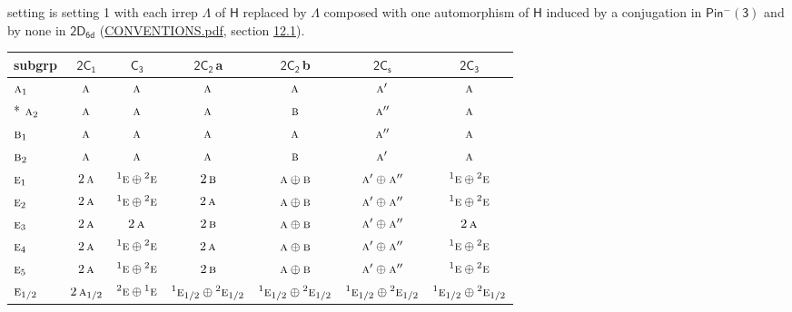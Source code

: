 \documentclass[10pt,a4paper]{article}
\numberwithin{equation}{section}
\newcommand{\grp}[1]{\mathsf{#1}}
\newcommand{\irr}[1]{\text{\normalfont\scshape #1}}
\newcommand{\conjpair}[1]{{}^{#1}}
\newcommand{\clsletter}[1]{\,{\scriptsize\color{black!55}#1}}
\begin{document}
setting is setting 1 with each irrep $\Lambda$ of $\grp{H}$ replaced by $\Lambda$ composed with one automorphism of $\grp{H}$ induced by a conjugation in \href{Pinminus3.pdf}{$\grp{Pin^{-}(3)}$} and by none in $\grp{2D_{6d}}$ (\href{../../CONVENTIONS.pdf}{CONVENTIONS.pdf}, section \href{../../../rotation/CONVENTIONS.pdf\#conv.12.1}{12.1}).
{\small\begin{longtable}{@{}lcccccc@{}}\toprule
subgrp & \href{2C1.pdf}{$\grp{2C_{1}}$} & \href{C3.pdf}{$\grp{C_{3}}$} & \href{2C2.pdf}{$\grp{2C_{2}}$}\clsletter{a} & \href{2C2.pdf}{$\grp{2C_{2}}$}\clsletter{b} & \href{2C1v.pdf}{$\grp{2C_{s}}$} & \href{2C3.pdf}{$\grp{2C_{3}}$}\\\midrule\endhead
\bottomrule\endfoot\endlastfoot
$\irr{a}_{1}$ & $\irr{a}$ & $\irr{a}$ & $\irr{a}$ & $\irr{a}$ & $\irr{a}'$ & $\irr{a}$\\*
$\irr{a}_{2}$ & $\irr{a}$ & $\irr{a}$ & $\irr{a}$ & $\irr{b}$ & $\irr{a}''$ & $\irr{a}$\\
$\irr{b}_{1}$ & $\irr{a}$ & $\irr{a}$ & $\irr{a}$ & $\irr{a}$ & $\irr{a}''$ & $\irr{a}$\\
$\irr{b}_{2}$ & $\irr{a}$ & $\irr{a}$ & $\irr{a}$ & $\irr{b}$ & $\irr{a}'$ & $\irr{a}$\\
$\irr{e}_{1}$ & $2\,\irr{a}$ & $\conjpair{1}\irr{e}\oplus \conjpair{2}\irr{e}$ & $2\,\irr{b}$ & $\irr{a}\oplus \irr{b}$ & $\irr{a}'\oplus \irr{a}''$ & $\conjpair{1}\irr{e}\oplus \conjpair{2}\irr{e}$\\
$\irr{e}_{2}$ & $2\,\irr{a}$ & $\conjpair{1}\irr{e}\oplus \conjpair{2}\irr{e}$ & $2\,\irr{a}$ & $\irr{a}\oplus \irr{b}$ & $\irr{a}'\oplus \irr{a}''$ & $\conjpair{1}\irr{e}\oplus \conjpair{2}\irr{e}$\\
$\irr{e}_{3}$ & $2\,\irr{a}$ & $2\,\irr{a}$ & $2\,\irr{b}$ & $\irr{a}\oplus \irr{b}$ & $\irr{a}'\oplus \irr{a}''$ & $2\,\irr{a}$\\
$\irr{e}_{4}$ & $2\,\irr{a}$ & $\conjpair{1}\irr{e}\oplus \conjpair{2}\irr{e}$ & $2\,\irr{a}$ & $\irr{a}\oplus \irr{b}$ & $\irr{a}'\oplus \irr{a}''$ & $\conjpair{1}\irr{e}\oplus \conjpair{2}\irr{e}$\\
$\irr{e}_{5}$ & $2\,\irr{a}$ & $\conjpair{1}\irr{e}\oplus \conjpair{2}\irr{e}$ & $2\,\irr{b}$ & $\irr{a}\oplus \irr{b}$ & $\irr{a}'\oplus \irr{a}''$ & $\conjpair{1}\irr{e}\oplus \conjpair{2}\irr{e}$\\
$\irr{e}_{1/2}$ & $2\,\irr{a}_{1/2}$ & $\conjpair{2}\irr{e}\oplus \conjpair{1}\irr{e}$ & $\conjpair{1}\irr{e}_{1/2}\oplus \conjpair{2}\irr{e}_{1/2}$ & $\conjpair{1}\irr{e}_{1/2}\oplus \conjpair{2}\irr{e}_{1/2}$ & $\conjpair{1}\irr{e}_{1/2}\oplus \conjpair{2}\irr{e}_{1/2}$ & $\conjpair{1}\irr{e}_{1/2}\oplus \conjpair{2}\irr{e}_{1/2}$\\

\end{longtable}}
\end{document}
